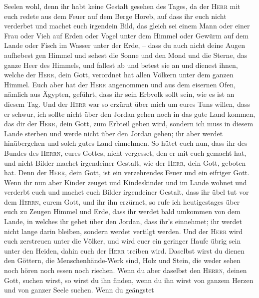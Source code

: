 Seelen wohl, denn ihr habt keine Gestalt gesehen des Tages, da der
\textsc{Herr} mit euch redete aus dem Feuer auf dem Berge Horeb,
 auf dass ihr euch nicht verderbet und machet euch
irgendein Bild, das gleich sei einem Mann oder einer Frau
 oder Vieh auf Erden oder Vogel unter dem Himmel
 oder Gewürm auf dem Lande oder Fisch im Wasser unter der
Erde, --  dass du auch nicht deine Augen aufhebest gen
Himmel und sehest die Sonne und den Mond und die Sterne, das ganze Heer
des Himmels, und fallest ab und betest sie an und dienest ihnen, welche
der \textsc{Herr}, dein Gott, verordnet hat allen Völkern unter dem
ganzen Himmel.  Euch aber hat der \textsc{Herr}
angenommen und aus dem eisernen Ofen, nämlich aus Ägypten, geführt, dass
ihr sein Erbvolk sollt sein, wie es ist an diesem Tag. 
Und der \textsc{Herr} war so erzürnt über mich um eures Tuns willen,
dass er schwur, ich sollte nicht über den Jordan gehen noch in das gute
Land kommen, das dir der \textsc{Herr}, dein Gott, zum Erbteil geben
wird,  sondern ich muss in diesem Lande sterben und werde
nicht über den Jordan gehen; ihr aber werdet hinübergehen und solch
gutes Land einnehmen.  So hütet euch nun, dass ihr des
Bundes des \textsc{Herrn}, eures Gottes, nicht vergesset, den er mit
euch gemacht hat, und nicht Bilder machet irgendeiner Gestalt, wie der
\textsc{Herr}, dein Gott, geboten hat.  Denn der
\textsc{Herr}, dein Gott, ist ein verzehrendes Feuer und ein eifriger
Gott.  Wenn ihr nun aber Kinder zeuget und Kindeskinder
und im Lande wohnet und verderbt euch und machet euch Bilder irgendeiner
Gestalt, dass ihr übel tut vor dem \textsc{Herrn}, eurem Gott, und ihr
ihn erzürnet,  so rufe ich heutigestages über euch zu
Zeugen Himmel und Erde, dass ihr werdet bald umkommen von dem Lande, in
welches ihr gehet über den Jordan, dass ihr's einnehmet; ihr werdet
nicht lange darin bleiben, sondern werdet vertilgt werden.
 Und der \textsc{Herr} wird euch zerstreuen unter die
Völker, und wird euer ein geringer Haufe übrig sein unter den Heiden,
dahin euch der \textsc{Herr} treiben wird.  Daselbst
wirst du dienen den Göttern, die Menschenhände-Werk sind, Holz und
Stein, die weder sehen noch hören noch essen noch riechen.
 Wenn du aber daselbst den \textsc{Herrn}, deinen Gott,
suchen wirst, so wirst du ihn finden, wenn du ihn wirst von ganzem
Herzen und von ganzer Seele suchen.  Wenn du geängstet
